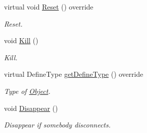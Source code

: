 \begin{DoxyCompactItemize}
\item 
\mbox{\label{class_player_a62d6a7a079668c0881910dc5e1b7b071}} 
virtual void \hyperlink{class_player_a62d6a7a079668c0881910dc5e1b7b071}{Reset} () override
\begin{DoxyCompactList}\small\item\em Reset. \end{DoxyCompactList}\item 
\mbox{\label{class_player_a0c74d6bd430490417bb34e9abc233bb7}} 
void \hyperlink{class_player_a0c74d6bd430490417bb34e9abc233bb7}{Kill} ()
\begin{DoxyCompactList}\small\item\em Kill. \end{DoxyCompactList}\item 
\mbox{\label{class_player_acdc10d7536a824e02d72d5a5b77875b1}} 
virtual Define\+Type \hyperlink{class_player_acdc10d7536a824e02d72d5a5b77875b1}{get\+Define\+Type} () override
\begin{DoxyCompactList}\small\item\em Type of \hyperlink{class_object}{Object}. \end{DoxyCompactList}\item 
\mbox{\label{class_player_a879e5feedffe7445c172968c6084aa54}} 
void \hyperlink{class_player_a879e5feedffe7445c172968c6084aa54}{Disappear} ()
\begin{DoxyCompactList}\small\item\em Disappear if somebody disconnects. \end{DoxyCompactList}\end{DoxyCompactItemize}

